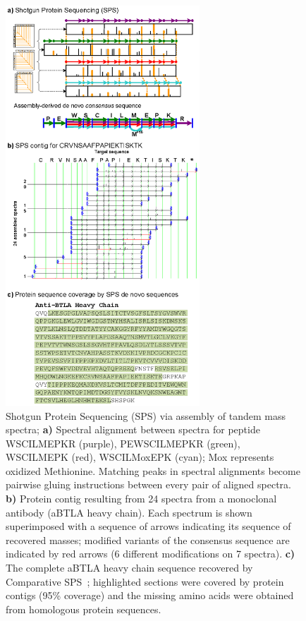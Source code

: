 \documentclass[8.5pt,twoside,twocolumn]{article}
\begin{document}
\begin{figure}[htb!]
\centering
  \includegraphics[height=15cm]{figures/figSPS.eps}
  \caption{Shotgun Protein Sequencing (SPS) via assembly of tandem mass spectra; \textbf{a)} Spectral alignment between spectra for peptide WSCILMEPKR (purple), PEWSCILMEPKR (green), WSCILMEPK (red), WSCILMoxEPK (cyan); Mox represents oxidized Methionine. Matching peaks in spectral alignments become pairwise gluing instructions between every pair of aligned spectra. \textbf{b)} Protein contig resulting from 24 spectra from a monoclonal antibody (aBTLA heavy chain). Each spectrum is shown superimposed with a sequence of arrows indicating its sequence of recovered masses; modified variants of the consensus sequence are indicated by red arrows (6 different modifications on 7 spectra). \textbf{c)} The complete aBTLA heavy chain sequence recovered by Comparative SPS~\cite{bandeira08}; highlighted sections were covered by protein contigs (95\% coverage) and the missing amino acids were obtained from homologous protein sequences.}
  \label{figSPS}
\end{figure}
\end{document}
